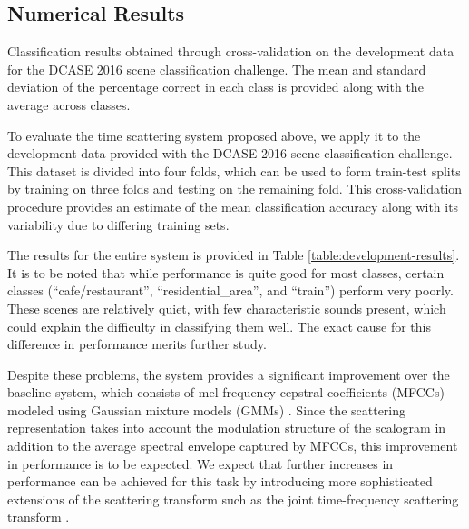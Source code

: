 \documentclass{article}
\begin{document}
\begin{sloppy}
\section{Numerical Results}
\label{sec:results}

\begin{table}[t]
\begin{center}

\end{center}
\caption{\label{table:development-results} Classification results obtained through cross-validation on the development data for the DCASE 2016 scene classification challenge. The mean and standard deviation of the percentage correct in each class is provided along with the average across classes.}
\end{table}

To evaluate the time scattering system proposed above, we apply it to the development data provided with the DCASE 2016 scene classification challenge. This dataset is divided into four folds, which can be used to form train-test splits by training on three folds and testing on the remaining fold. This cross-validation procedure provides an estimate of the mean classification accuracy along with its variability due to differing training sets.

The results for the entire system is provided in Table \ref{table:development-results}. It is to be noted that while performance is quite good for most classes, certain classes (``cafe/restaurant'', ``residential\_area'', and ``train'') perform very poorly. These scenes are relatively quiet, with few characteristic sounds present, which could explain the difficulty in classifying them well. The exact cause for this difference in performance merits further study.

Despite these problems, the system provides a significant improvement over the baseline system, which consists of mel-frequency cepstral coefficients (MFCCs) modeled using Gaussian mixture models (GMMs) \cite{heittola}. Since the scattering representation takes into account the modulation structure of the scalogram in addition to the average spectral envelope captured by MFCCs, this improvement in performance is to be expected. We expect that further increases in performance can be achieved for this task by introducing more sophisticated extensions of the scattering transform such as the joint time-frequency scattering transform \cite{joint}.




\end{sloppy}
\end{document}
